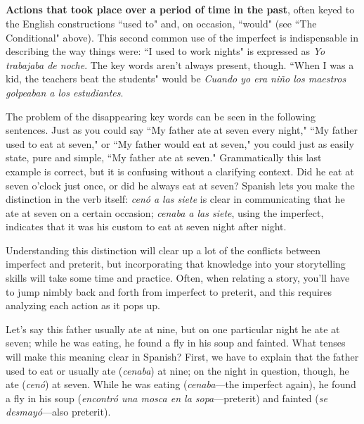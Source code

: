 \subsection{}

\textbf{Actions that took place over a period of time in the past},
often keyed to the English constructions ``used to" and, on occasion,
``would" (see ``The Conditional" above). This second common use of
the imperfect is indispensable in describing the way things were: ``I
used to work nights" is expressed as \emph{Yo trabajaba de noche}. The key
words aren't always present, though. ``When I was a kid, the teachers
beat the students" would be \emph{Cuando yo era niño los maestros golpeaban a los estudiantes}.

The problem of the disappearing key words can be seen in the
following sentences. Just as you could say ``My father ate at seven every night," ``My father used to eat at seven," or ``My father would eat
at seven," you could just as easily state, pure and simple, ``My father
ate at seven." Grammatically this last example is correct, but it is confusing without a clarifying context. Did he eat at seven o'clock just
once, or did he always eat at seven? Spanish lets you make the distinction in the verb itself: \emph{cenó a las siete} is clear in communicating that
he ate at seven on a certain occasion; \emph{cenaba a las siete}, using the
imperfect, indicates that it was his custom to eat at seven night after
night.

Understanding this distinction will clear up a lot of the conflicts between imperfect and preterit, but incorporating that knowledge
into your storytelling skills will take some time and practice. Often,
when relating a story, you'll have to jump nimbly back and forth from
imperfect to preterit, and this requires analyzing each action as it
pops up.

Let's say this father usually ate at nine, but on one particular
night he ate at seven; while he was eating, he found a fly in his soup
and fainted. What tenses will make this meaning clear in Spanish?
First, we have to explain that the father used to eat or usually ate (\emph{cenaba}) at nine; on the night in question, though, he ate (\emph{cenó}) at seven.
While he was eating (\emph{cenaba}---the imperfect again), he found a fly in
his soup (\emph{encontró una mosca en la sopa}---preterit) and fainted (\emph{se desmayó}---also preterit).

